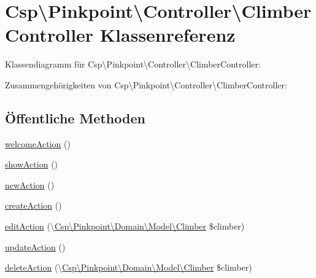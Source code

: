 \hypertarget{classCsp_1_1Pinkpoint_1_1Controller_1_1ClimberController}{}\section{Csp\textbackslash{}Pinkpoint\textbackslash{}Controller\textbackslash{}Climber\+Controller Klassenreferenz}
\label{classCsp_1_1Pinkpoint_1_1Controller_1_1ClimberController}


Klassendiagramm für Csp\textbackslash{}Pinkpoint\textbackslash{}Controller\textbackslash{}Climber\+Controller\+:


Zusammengehörigkeiten von Csp\textbackslash{}Pinkpoint\textbackslash{}Controller\textbackslash{}Climber\+Controller\+:
\subsection*{Öffentliche Methoden}
\begin{DoxyCompactItemize}
\item 
\hyperlink{classCsp_1_1Pinkpoint_1_1Controller_1_1ClimberController_af0655e8163acb5d127a2c07d7639d167}{welcome\+Action} ()
\item 
\hyperlink{classCsp_1_1Pinkpoint_1_1Controller_1_1ClimberController_a6951fc8073bdd95f447586a8f03a68d9}{show\+Action} ()
\item 
\hyperlink{classCsp_1_1Pinkpoint_1_1Controller_1_1ClimberController_ae28f787b131ea1eeafea0942cf89bed6}{new\+Action} ()
\item 
\hyperlink{classCsp_1_1Pinkpoint_1_1Controller_1_1ClimberController_a9a94dc8991a74d5692a93354573b89c8}{create\+Action} ()
\item 
\hyperlink{classCsp_1_1Pinkpoint_1_1Controller_1_1ClimberController_a672eaf4eb56364790e8c9a89f603b8fe}{edit\+Action} (\textbackslash{}\hyperlink{classCsp_1_1Pinkpoint_1_1Domain_1_1Model_1_1Climber}{Csp\textbackslash{}\+Pinkpoint\textbackslash{}\+Domain\textbackslash{}\+Model\textbackslash{}\+Climber} \$climber)
\item 
\hyperlink{classCsp_1_1Pinkpoint_1_1Controller_1_1ClimberController_a1535432a78fa8376b3f061bbbe929898}{update\+Action} ()
\item 
\hyperlink{classCsp_1_1Pinkpoint_1_1Controller_1_1ClimberController_af9e56ebf2cb511b8e4215a309e25fbfc}{delete\+Action} (\textbackslash{}\hyperlink{classCsp_1_1Pinkpoint_1_1Domain_1_1Model_1_1Climber}{Csp\textbackslash{}\+Pinkpoint\textbackslash{}\+Domain\textbackslash{}\+Model\textbackslash{}\+Climber} \$climber)
\end{DoxyCompactItemize}
